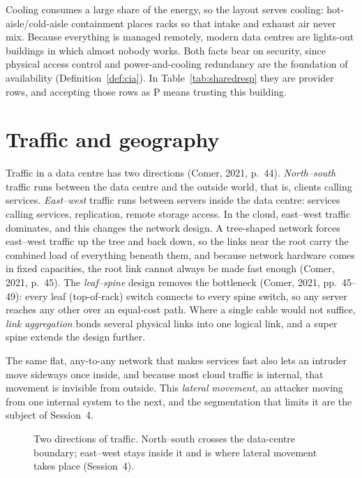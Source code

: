 Cooling consumes a large share of the energy, so the layout serves cooling:
hot-aisle/cold-aisle containment places racks so that intake and exhaust air
never mix. Because everything is managed remotely, modern data centres are
lights-out buildings in which almost nobody works. Both facts bear on
security, since physical access control and power-and-cooling redundancy are
the foundation of availability (Definition~\ref{def:cia}). In
Table~\ref{tab:sharedresp} they are provider rows, and accepting those rows
as P means trusting this building.

\section{Traffic and geography}

Traffic in a data centre has two directions (Comer, 2021, p.~44).
\emph{North--south} traffic runs between the data centre and the outside
world, that is, clients calling services. \emph{East--west} traffic runs
between servers inside the data centre: services calling services,
replication, remote storage access. In the cloud, east--west traffic
dominates, and this changes the network design. A tree-shaped network forces
east--west traffic up the tree and back down, so the links near the root
carry the combined load of everything beneath them, and because network
hardware comes in fixed capacities, the root link cannot always be made fast
enough (Comer, 2021, p.~45). The \emph{leaf--spine} design removes the
bottleneck (Comer, 2021, pp.~45--49): every leaf (top-of-rack) switch
connects to every spine switch, so any server reaches any other over an
equal-cost path. Where a single cable would not suffice, \emph{link
aggregation} bonds several physical links into one logical link, and a super
spine extends the design further.

The same flat, any-to-any network that makes services fast also lets an
intruder move sideways once inside, and because most cloud traffic is
internal, that movement is invisible from outside. This \emph{lateral
movement}, an attacker moving from one internal system to the next, and the
segmentation that limits it are the subject of Session~4.

\begin{figure}[htbp]
\centering
{}
\caption{Two directions of traffic. North--south crosses the data-centre
boundary; east--west stays inside it and is where lateral movement takes place
(Session~4).}
\label{fig:nsew}
\end{figure}

